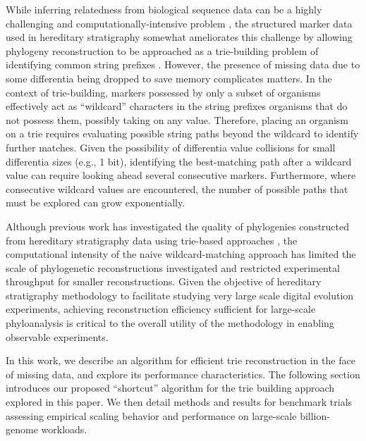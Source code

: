 While inferring relatedness from biological sequence data can be a highly challenging and computationally-intensive problem \citep{miller2010creating},
the structured marker data used in hereditary stratigraphy somewhat ameliorates this challenge by allowing phylogeny reconstruction to be approached as a trie-building problem of identifying common string prefixes \citep{delabriandais1959file,moreno2024analysis}.
However, the presence of missing data due to some differentia being dropped to save memory complicates matters.
In the context of trie-building, markers possessed by only a subset of organisms effectively act as ``wildcard'' characters in the string prefixes organisms that do not possess them, possibly taking on any value.
Therefore, placing an organism on a trie requires evaluating possible string paths beyond the wildcard to identify further matches.
Given the possibility of differentia value collisions for small differentia sizes (e.g., 1 bit), identifying the best-matching path after a wildcard value can require looking ahead several consecutive markers.
Furthermore, where consecutive wildcard values are encountered, the number of possible paths that must be explored can grow exponentially.

Although previous work has investigated the quality of phylogenies constructed from hereditary stratigraphy data using trie-based approaches \citep{moreno2025testing}, the computational intensity of the naive wildcard-matching approach has limited the scale of phylogenetic reconstructions investigated and restricted experimental throughput for smaller reconstructions.
Given the objective of hereditary stratigraphy methodology to facilitate studying very large scale digital evolution experiments, achieving reconstruction efficiency sufficient for large-scale phyloanalysis is critical to the overall utility of the methodology in enabling observable experiments.

In this work, we describe an algorithm for efficient trie reconstruction in the face of missing data, and explore its performance characteristics.
The following section introduces our proposed ``shortcut'' algorithm for the trie building approach explored in this paper.
We then detail methods and results for benchmark trials assessing empirical scaling behavior and performance on large-scale billion-genome workloads.

% 

